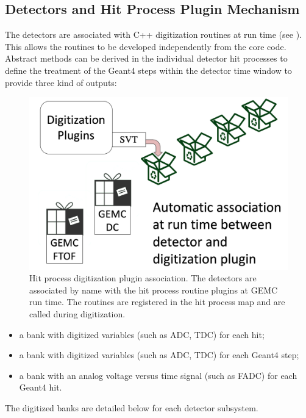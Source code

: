 \subsection{Detectors and Hit Process Plugin Mechanism}

The detectors are associated with C++ digitization routines at run time (see ).
This allows the routines to be developed independently from the core code. Abstract methods can be derived in
the individual detector hit processes to define the treatment of the Geant4 steps within the detector
time window to provide three kind of outputs:

\begin{figure}
	\centering
	\includegraphics[width=1.0\columnwidth,keepaspectratio]{img/pluginsAssociation.png}
	\caption{Hit process digitization plugin association. The detectors are associated by name with the hit process routine
             plugins at GEMC run time. The routines are registered in the hit process map and are called during digitization.}
	\label{fig:pluginsAssociation}
\end{figure}


\begin{itemize}
	\item a bank with digitized variables (such as ADC, TDC) for each hit;
	\item a bank with digitized variables (such as ADC, TDC) for each Geant4 step;
	\item a bank with an analog voltage versus time signal (such as FADC) for each Geant4 hit.
\end{itemize}

The digitized banks are detailed below for each detector subsystem.

